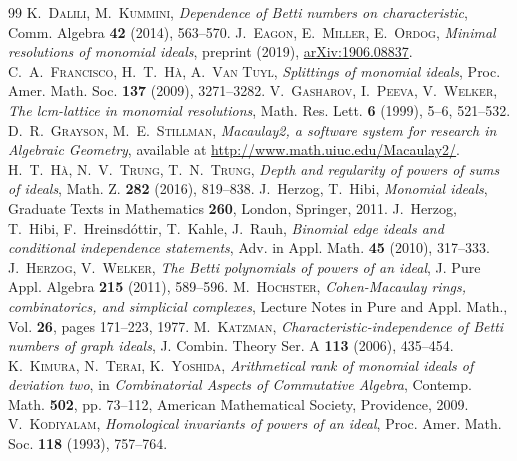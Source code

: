 \documentclass[11pt,oneside]{amsart}
\theoremstyle{plain}
\theoremstyle{definition}
\newcommand{\rc}{\color{red}}
\begin{document}
\begin{thebibliography}{99}
 \textsc{K.~Dalili, M.~Kummini}, \textit{Dependence of Betti numbers on characteristic}, Comm. Algebra \textbf{42} (2014), 563--570.
 \textsc{J.~Eagon, E.~Miller, E.~Ordog}, \textit{Minimal resolutions of monomial ideals}, preprint (2019), \href{https://arxiv.org/abs/1906.08837}{arXiv:1906.08837}.
 \textsc{C.~A.~Francisco, H.~T.~Hà, A.~Van Tuyl}, \textit{Splittings of monomial ideals}, Proc. Amer. Math. Soc. \textbf{137} (2009), 3271--3282.
 \textsc{V.~Gasharov, I.~Peeva, V.~Welker}, \textit{The lcm-lattice in monomial resolutions}, Math. Res. Lett. \textbf{6} (1999), 5--6, 521--532.
 \textsc{D.~R.~Grayson, M.~E.~Stillman}, \textit{Macaulay2, a software system for research in Algebraic Geometry}, available at \href{http://www.math.uiuc.edu/Macaulay2/}{http://www.math.uiuc.edu/Macaulay2/}.
 \textsc{H.~T.~Hà, N.~V.~Trung, T.~N.~Trung}, \textit{Depth and regularity of powers of sums of ideals}, Math. Z. \textbf{282} (2016), 819--838.
 {\sc J.~Herzog, T.~Hibi}, \textit{Monomial ideals}, Graduate Texts in Mathematics \textbf{260}, London, Springer, 2011. 
 {\sc J.~Herzog, T.~Hibi, F.~Hreinsdóttir, T.~Kahle, J.~Rauh}, \textit{Binomial edge ideals and conditional independence statements}, Adv. in Appl. Math. \textbf{45} (2010), 317--333.
 \textsc{J.~Herzog, V.~Welker}, \textit{The Betti polynomials of powers of an ideal}, J. Pure Appl. Algebra \textbf{215} (2011), 589--596.
 \textsc{M.~Hochster}, \textit{Cohen-Macaulay rings, combinatorics, and simplicial complexes}, Lecture Notes in Pure and Appl. Math., Vol. \textbf{26}, pages 171--223, 1977.
 \textsc{M.~Katzman}, \textit{Characteristic-independence of Betti numbers of graph ideals}, J. Combin. Theory Ser. A \textbf{113} (2006), 435--454.
 \textsc{K.~Kimura, N.~Terai, K.~Yoshida}, \textit{Arithmetical rank of monomial ideals of deviation two}, in \textit{Combinatorial Aspects of Commutative Algebra}, Contemp. Math. \textbf{502}, pp. 73--112, American Mathematical Society, Providence, 2009.
 \textsc{V.~Kodiyalam}, \textit{Homological invariants of powers of an ideal}, Proc. Amer. Math. Soc. \textbf{118} (1993), 757--764.

\end{thebibliography}
\end{document}

